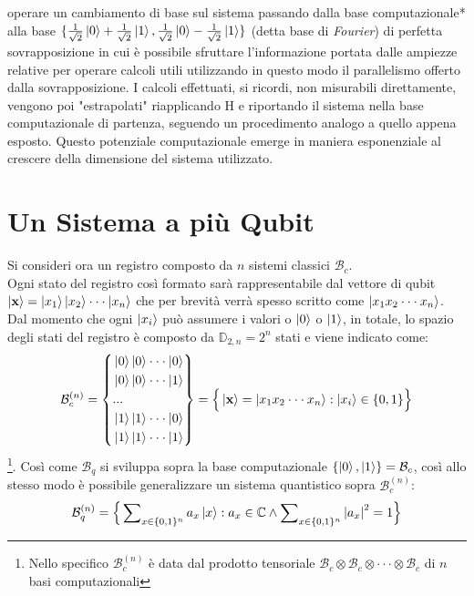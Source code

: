 \documentclass[12pt,a4paper,openright]{report}
\begin{document}
operare un cambiamento di base \cite{ref8} sul sistema passando dalla base computazionale* alla base $\{\frac{1}{\sqrt2}\ket0 + \frac{1}{\sqrt2}\ket1, \frac{1}{\sqrt2}\ket0 - \frac{1}{\sqrt2}\ket1\}$ (detta base di \emph{Fourier}) di
perfetta sovrapposizione in cui è possibile sfruttare l'informazione portata dalle ampiezze relative per operare calcoli utili utilizzando in questo modo il parallelismo offerto dalla sovrapposizione. I calcoli effettuati,
si ricordi, non misurabili direttamente, vengono poi "estrapolati" riapplicando H e riportando il sistema nella base computazionale di partenza, seguendo un procedimento analogo a quello appena esposto.
Questo potenziale computazionale emerge in maniera esponenziale al crescere della dimensione del sistema utilizzato.

\section{Un Sistema a più Qubit}
Si consideri ora un registro composto da $n$ sistemi classici $\mathcal{B}_c$.\\
Ogni stato del registro così formato sarà rappresentabile dal vettore di qubit $\ket{\textbf{x}}= \ket{x_1}\ket{x_2}\cdot\cdot\cdot\ket{x_n}$ che per brevità verrà spesso scritto come $\ket{x_1 x_2 \cdot\cdot\cdot x_n}$.
Dal momento che ogni $\ket{x_i}$ può assumere i valori o $\ket0$ o $\ket1$, in totale, lo spazio degli stati del registro è composto da $\mathbb{D}_{2,n}=2^n$ stati e viene indicato come:
\begin{equation*}
    \mathcal{B}_c^{(n)} = \left\{ 
    \begin{aligned}
        & \ket0 \ket0 \cdot \cdot \cdot \ket0 \\
        & \ket0 \ket0 \cdot \cdot \cdot \ket1 \\
        & ... \\
        & \ket1 \ket1 \cdot \cdot \cdot \ket0 \\
        & \ket1 \ket1 \cdot \cdot \cdot \ket1
    \end{aligned}
    \right\} = \Big\{\ket{\textbf{x}}=\ket{x_1 x_2 \cdot \cdot \cdot x_n} : \ket{x_i} \in \{0,1\} \Big\}
\end{equation*}
\footnote{Nello specifico $\mathcal{B}_c^{(n)}$ è data dal prodotto tensoriale $\mathcal{B}_c \otimes \mathcal{B}_c \otimes \cdot\cdot\cdot \otimes \mathcal{B}_c$ di $n$ basi computazionali }. Così come $\mathcal{B}_q$ si sviluppa sopra la base computazionale $\{\ket0, \ket1 \}= \mathcal{B}_c$, così allo stesso modo è possibile generalizzare un sistema quantistico sopra $\mathcal{B}_c^{(n)}$:
\[
    \mathcal{B}_q^{(n)} = \Big\{ \sum\nolimits_{x \in \{0,1\}^{n}} a_x \ket{x} : a_x \in \mathbb{C} \land \sum\nolimits_{x\in\{0,1\}^{n}} {\left\vert{a_x}\right\vert}^2 = 1\Big\}
\]
\end{document}
